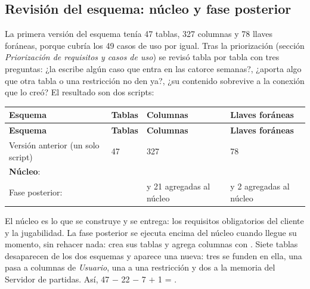 \subsection*{Revisión del esquema: núcleo y fase posterior}

La primera versión del esquema tenía 47 tablas, 327 columnas y 78 llaves foráneas, porque cubría los 49 casos de uso por igual. Tras la priorización (sección \textit{Priorización de requisitos y casos de uso}) se revisó tabla por tabla con tres preguntas: ¿la escribe algún caso que entra en las catorce semanas?, ¿aporta algo que otra tabla o una restricción no den ya?, ¿su contenido sobrevive a la conexión que lo creó? El resultado son dos scripts:

\begin{center}\small
\begin{longtable}{|L{0.34\textwidth}|L{0.12\textwidth}|L{0.12\textwidth}|L{0.28\textwidth}|}
\hline
\textbf{Esquema} & \textbf{Tablas} & \textbf{Columnas} & \textbf{Llaves foráneas} \\ \hline
\endfirsthead
\hline
\textbf{Esquema} & \textbf{Tablas} & \textbf{Columnas} & \textbf{Llaves foráneas} \\ \hline
\endhead
Versión anterior (un solo script) & 47 & 327 & 78 \\ \hline
\textbf{Núcleo}:  & \textbf{\bdNumTablas{}} & \textbf{\bdNumColumnas{}} & \textbf{\bdNumForaneas{}} \\ \hline
Fase posterior:  & \bdFpNumTablas{} & \bdFpNumColumnas{} y 21 agregadas al núcleo & \bdFpNumForaneas{} y 2 agregadas al núcleo \\ \hline
\end{longtable}
\end{center}

El núcleo es lo que se construye y se entrega: los requisitos obligatorios del cliente y la jugabilidad. La fase posterior se ejecuta encima del núcleo cuando llegue su momento, sin rehacer nada: crea sus tablas y agrega columnas con . Siete tablas desaparecen de los dos esquemas y aparece una nueva: tres se funden en ella, una pasa a columnas de \textit{Usuario}, una a una restricción y dos a la memoria del Servidor de partidas. Así, 47 $-$ 22 $-$ 7 $+$ 1 = \bdNumTablas{}.

